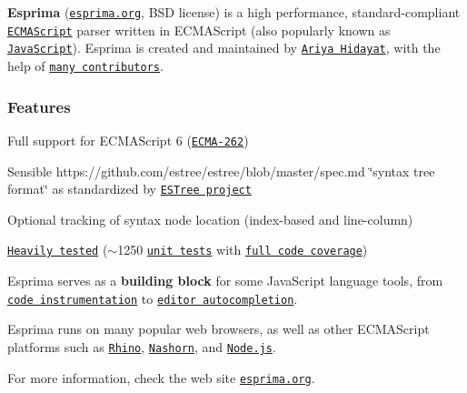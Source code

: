 \href{https://www.npmjs.com/package/esprima}{\tt } \href{https://www.npmjs.com/package/esprima}{\tt } \href{https://travis-ci.org/jquery/esprima}{\tt } \href{https://codecov.io/github/jquery/esprima}{\tt }

{\bfseries Esprima} (\href{http://esprima.org}{\tt esprima.\+org}, B\+SD license) is a high performance, standard-\/compliant \href{http://www.ecma-international.org/publications/standards/Ecma-262.htm}{\tt E\+C\+M\+A\+Script} parser written in E\+C\+M\+A\+Script (also popularly known as \href{https://en.wikipedia.org/wiki/JavaScript}{\tt Java\+Script}). Esprima is created and maintained by \href{https://twitter.com/ariyahidayat}{\tt Ariya Hidayat}, with the help of \href{https://github.com/jquery/esprima/contributors}{\tt many contributors}.

\subsubsection*{Features}


\begin{DoxyItemize}
\item Full support for E\+C\+M\+A\+Script 6 (\href{http://www.ecma-international.org/publications/standards/Ecma-262.htm}{\tt E\+C\+M\+A-\/262})
\item Sensible https\+://github.com/estree/estree/blob/master/spec.\+md \char`\"{}syntax tree format\char`\"{} as standardized by \href{https://github.com/estree/estree}{\tt E\+S\+Tree project}
\item Optional tracking of syntax node location (index-\/based and line-\/column)
\item \href{http://esprima.org/test/ci.html}{\tt Heavily tested} ($\sim$1250 \href{https://github.com/jquery/esprima/tree/master/test/fixtures}{\tt unit tests} with \href{https://codecov.io/github/jquery/esprima}{\tt full code coverage})
\end{DoxyItemize}

Esprima serves as a {\bfseries building block} for some Java\+Script language tools, from \href{http://esprima.org/demo/functiontrace.html}{\tt code instrumentation} to \href{http://esprima.org/demo/autocomplete.html}{\tt editor autocompletion}.

Esprima runs on many popular web browsers, as well as other E\+C\+M\+A\+Script platforms such as \href{http://www.mozilla.org/rhino}{\tt Rhino}, \href{http://openjdk.java.net/projects/nashorn/}{\tt Nashorn}, and \href{https://npmjs.org/package/esprima}{\tt Node.\+js}.

For more information, check the web site \href{http://esprima.org}{\tt esprima.\+org}. 
